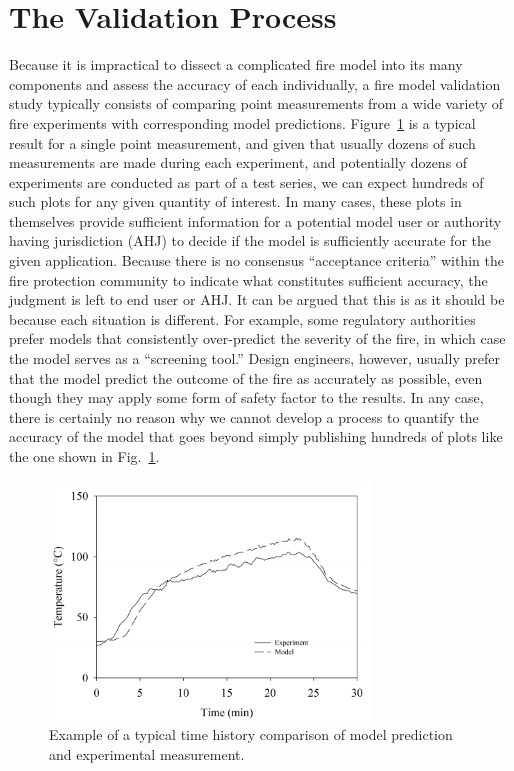 \section{The Validation Process}

Because it is impractical to dissect a complicated fire model into its many components and assess the accuracy of each individually,
a fire model validation study typically consists of comparing point measurements from a wide variety of fire experiments with corresponding model predictions.
Figure~\ref{temp_history} is a typical result for a single point measurement, and given that usually dozens of such measurements are made during each experiment,
and potentially dozens of experiments are conducted as part of a test series, we can expect hundreds of such plots for any given quantity of interest. In many cases, these
plots in themselves provide sufficient information for a potential model user or authority having jurisdiction (AHJ) to decide if the model is sufficiently accurate for the
given application. Because there is no consensus ``acceptance criteria'' within the fire protection community to indicate what constitutes sufficient accuracy, the
judgment is left to end user or AHJ. It can be argued that this is as it should be because each situation is different. For example, some regulatory
authorities prefer models that consistently over-predict the severity of the fire, in which case the model serves as a ``screening tool.'' Design engineers, however,
usually prefer that the model predict the outcome of the fire as accurately as possible, even though they may apply some form of safety factor to the results.
In any case, there is certainly no reason why we cannot develop a process to quantify the accuracy of the model that goes beyond simply
publishing hundreds of plots like the one shown in Fig.~\ref{temp_history}.

\begin{figure}[t]
\begin{center}
\includegraphics[height=2.5in]{FIGURES/sample_time_history}
\end{center}
\caption[Sample time history plots.]{Example of a typical time history comparison of model prediction and experimental measurement.}
\label{temp_history}
\end{figure}

